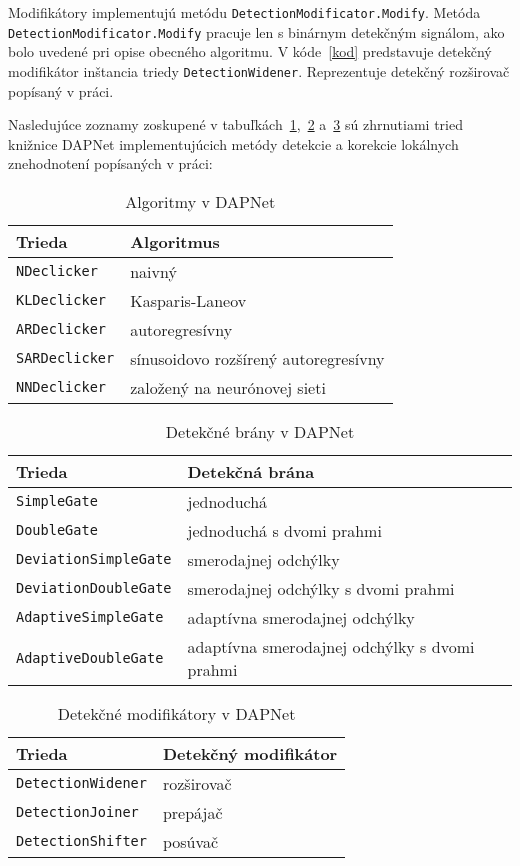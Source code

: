 Modifikátory implementujú metódu \texttt{DetectionModificator.Modify}. Metóda \texttt{DetectionModificator.Modify} pracuje len s binárnym detekčným signálom, ako bolo uvedené pri opise obecného algoritmu. V kóde~\ref{kod} predstavuje detekčný modifikátor inštancia triedy \texttt{DetectionWidener}. Reprezentuje detekčný rozširovač popísaný v práci. 

Nasledujúce zoznamy zoskupené v tabuľkách~\ref{tabulka:algoritmy},~\ref{tabulka:brany} a~\ref{tabulka:modifikatory} sú zhrnutiami tried knižnice DAPNet implementujúcich metódy detekcie a korekcie lokálnych znehodnotení popísaných v práci:

\begin{table}[!h]
\centering
\caption{Algoritmy v DAPNet}
\begin{tabular}{l l}
\hline
Trieda & Algoritmus\\
\hline
\texttt{NDeclicker} & naivný\\
\texttt{KLDeclicker} & Kasparis-Laneov\\
\texttt{ARDeclicker} & autoregresívny\\
\texttt{SARDeclicker} & sínusoidovo rozšírený autoregresívny\\
\texttt{NNDeclicker} & založený na neurónovej sieti\\
\hline
\end{tabular}
\label{tabulka:algoritmy}
\end{table}

\begin{table}[!h]
\centering
\caption{Detekčné brány v DAPNet}
\begin{tabular}{l l}
\hline
Trieda & Detekčná brána\\
\hline
\texttt{SimpleGate} & jednoduchá \\
\texttt{DoubleGate} & jednoduchá s dvomi prahmi\\
\texttt{DeviationSimpleGate} & smerodajnej odchýlky \\
\texttt{DeviationDoubleGate} & smerodajnej odchýlky s dvomi prahmi\\
\texttt{AdaptiveSimpleGate} & adaptívna smerodajnej odchýlky\\
\texttt{AdaptiveDoubleGate} & adaptívna smerodajnej odchýlky s dvomi prahmi\\
\hline
\end{tabular}
\label{tabulka:brany}
\end{table}

\begin{table}[!h]
\centering
\caption{Detekčné modifikátory v DAPNet}
\begin{tabular}{l l}
\hline
Trieda & Detekčný modifikátor\\
\hline
\texttt{DetectionWidener} & rozširovač\\
\texttt{DetectionJoiner} & prepájač\\
\texttt{DetectionShifter} & posúvač\\
\hline
\end{tabular}
\label{tabulka:modifikatory}
\end{table}

